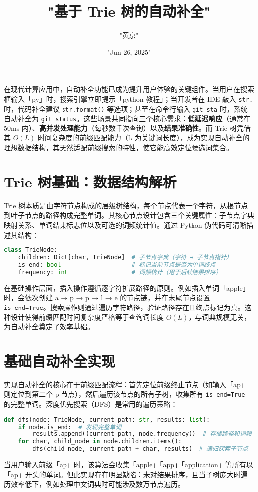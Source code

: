 \title{"基于 Trie 树的自动补全"}
\author{"黄京"}
\date{"Jun 26, 2025"}
\maketitle
在现代计算应用中，自动补全功能已成为提升用户体验的关键组件。当用户在搜索框输入「py」时，搜索引擎立即提示「python 教程」；当开发者在 IDE 敲入 \texttt{str.} 时，代码补全建议 \texttt{str.format()} 等选项；甚至在命令行输入 \texttt{git sta} 时，系统自动补全为 \texttt{git status}。这些场景共同指向三个核心需求：\textbf{低延迟响应}（通常在 50ms 内）、\textbf{高并发处理能力}（每秒数千次查询）以及\textbf{结果准确性}。而 Trie 树凭借其 $O(L)$ 时间复杂度的前缀匹配能力（L 为关键词长度），成为实现自动补全的理想数据结构，其天然适配前缀搜索的特性，使它能高效定位候选词集合。\par
\chapter{Trie 树基础：数据结构解析}
Trie 树本质是由字符节点构成的层级树结构，每个节点代表一个字符，从根节点到叶子节点的路径构成完整单词。其核心节点设计包含三个关键属性：子节点字典映射关系、单词结束标志位以及可选的词频统计值。通过 Python 伪代码可清晰描述其结构：\par
\begin{lstlisting}[language=python]
class TrieNode:
    children: Dict[char, TrieNode]  # 子节点字典（字符 → 子节点指针）
    is_end: bool                    # 标记当前节点是否为单词终点
    frequency: int                  # 词频统计（用于后续结果排序）
\end{lstlisting}
在基础操作层面，插入操作遵循逐字符扩展路径的原则。例如插入单词「apple」时，会依次创建 a → p → p → l → e 的节点链，并在末尾节点设置 \texttt{is\_{}end=True}。搜索操作则通过遍历字符路径，验证路径存在且终点标记为真。这种设计使得前缀匹配时间复杂度严格等于查询词长度 $O(L)$，与词典规模无关，为自动补全奠定了效率基础。\par
\chapter{基础自动补全实现}
实现自动补全的核心在于前缀匹配流程：首先定位前缀终止节点（如输入「ap」则定位到第二个 p 节点），然后遍历该节点的所有子树，收集所有 \texttt{is\_{}end=True} 的完整单词。深度优先搜索（DFS）是常用的遍历策略：\par
\begin{lstlisting}[language=python]
def dfs(node: TrieNode, current_path: str, results: list):
    if node.is_end:  # 发现完整单词
        results.append((current_path, node.frequency))  # 存储路径和词频
    for char, child_node in node.children.items():
        dfs(child_node, current_path + char, results)  # 递归探索子节点
\end{lstlisting}
当用户输入前缀「ap」时，该算法会收集「apple」「app」「application」等所有以「ap」开头的单词。但此实现存在明显缺陷：未对结果排序，且当子树庞大时遍历效率低下，例如处理中文词典时可能涉及数万节点遍历。\par
